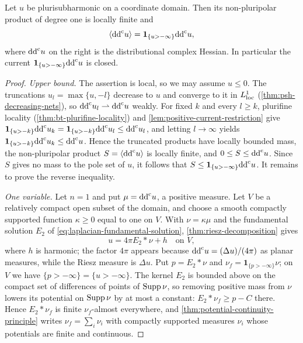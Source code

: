 \begin{proposition}\label{prop:nonpluripolar-degree-one-restriction}
Let $u$ be plurisubharmonic on a coordinate domain. Then its non-pluripolar product of degree one is locally finite and
\begin{equation}\label{eq:nonpluripolar-degree-one-restriction}
 \langle\mathrm{dd}^{\mathrm{c}} u\rangle=\mathbf1_{\{u>-\infty\}}\mathrm{dd}^{\mathrm{c}} u,
\end{equation}
where $\mathrm{dd}^{\mathrm{c}} u$ on the right is the distributional complex Hessian. In particular the current $\mathbf1_{\{u>-\infty\}}\mathrm{dd}^{\mathrm{c}} u$ is closed.
\end{proposition}
\begin{proof}
\emph{Upper bound.} The assertion is local, so we may assume $u\leq0$. The truncations $u_l=\max\{u,-l\}$ decrease to $u$ and converge to it in $L^1_{\mathrm{loc}}$ (\cref{thm:psh-decreasing-nets}), so $\mathrm{dd}^{\mathrm{c}} u_l\rightharpoonup\mathrm{dd}^{\mathrm{c}} u$ weakly. For fixed $k$ and every $l\geq k$, plurifine locality (\cref{thm:bt-plurifine-locality}) and \cref{lem:positive-current-restriction} give $\mathbf1_{\{u>-k\}}\mathrm{dd}^{\mathrm{c}} u_k=\mathbf1_{\{u>-k\}}\mathrm{dd}^{\mathrm{c}} u_l\leq\mathrm{dd}^{\mathrm{c}} u_l$, and letting $l\to\infty$ yields $\mathbf1_{\{u>-k\}}\mathrm{dd}^{\mathrm{c}} u_k\leq\mathrm{dd}^{\mathrm{c}} u$. Hence the truncated products have locally bounded mass, the non-pluripolar product $S=\langle\mathrm{dd}^{\mathrm{c}} u\rangle$ is locally finite, and $0\leq S\leq\mathrm{dd}^{\mathrm{c}} u$. Since $S$ gives no mass to the pole set of $u$, it follows that $S\leq\mathbf1_{\{u>-\infty\}}\mathrm{dd}^{\mathrm{c}} u$. It remains to prove the reverse inequality.

\emph{One variable.} Let $n=1$ and put $\mu=\mathrm{dd}^{\mathrm{c}} u$, a positive measure. Let $V$ be a relatively compact open subset of the domain, and choose a smooth compactly supported function $\kappa\geq0$ equal to one on $V$. With $\nu=\kappa\mu$ and the fundamental solution $E_2$ of \eqref{eq:laplacian-fundamental-solution}, \cref{thm:riesz-decomposition} gives
\[
 u=4\pi E_2*\nu+h\quad\text{on }V,
\]
where $h$ is harmonic; the factor $4\pi$ appears because $\mathrm{dd}^{\mathrm{c}} u=(\Delta u)/(4\pi)$ as planar measures, while the Riesz measure is $\Delta u$. Put $p=E_2*\nu$ and $\nu_f=\mathbf1_{\{p>-\infty\}}\nu$; on $V$ we have $\{p>-\infty\}=\{u>-\infty\}$. The kernel $E_2$ is bounded above on the compact set of differences of points of $\operatorname{Supp}\nu$, so removing positive mass from $\nu$ lowers its potential on $\operatorname{Supp}\nu$ by at most a constant: $E_2*\nu_f\geq p-C$ there. Hence $E_2*\nu_f$ is finite $\nu_f$-almost everywhere, and \cref{thm:potential-continuity-principle} writes $\nu_f=\sum_i\nu_i$ with compactly supported measures $\nu_i$ whose potentials are finite and continuous.


\end{proof}
